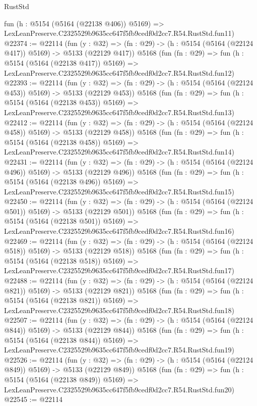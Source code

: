 \begin{lexlean}{RustStd}
\begin{coremodule}
    fun (h : @5154 (@5164 (@22138 @406)) @5169) =>
    LexLeanPreserve.C2325529b9635cc647f5fb9cedf0d2cc7.R54.RustStd.fun11)
@22374 := @22114
    (fun (y : @32) => (fn : @29) -> (h : @5154 (@5164 (@22124 @417)) @5169) -> @5133 (@22129 @417))
    @5168
    (fun (fn : @29) =>
    fun (h : @5154 (@5164 (@22138 @417)) @5169) =>
    LexLeanPreserve.C2325529b9635cc647f5fb9cedf0d2cc7.R54.RustStd.fun12)
@22393 := @22114
    (fun (y : @32) => (fn : @29) -> (h : @5154 (@5164 (@22124 @453)) @5169) -> @5133 (@22129 @453))
    @5168
    (fun (fn : @29) =>
    fun (h : @5154 (@5164 (@22138 @453)) @5169) =>
    LexLeanPreserve.C2325529b9635cc647f5fb9cedf0d2cc7.R54.RustStd.fun13)
@22412 := @22114
    (fun (y : @32) => (fn : @29) -> (h : @5154 (@5164 (@22124 @458)) @5169) -> @5133 (@22129 @458))
    @5168
    (fun (fn : @29) =>
    fun (h : @5154 (@5164 (@22138 @458)) @5169) =>
    LexLeanPreserve.C2325529b9635cc647f5fb9cedf0d2cc7.R54.RustStd.fun14)
@22431 := @22114
    (fun (y : @32) => (fn : @29) -> (h : @5154 (@5164 (@22124 @496)) @5169) -> @5133 (@22129 @496))
    @5168
    (fun (fn : @29) =>
    fun (h : @5154 (@5164 (@22138 @496)) @5169) =>
    LexLeanPreserve.C2325529b9635cc647f5fb9cedf0d2cc7.R54.RustStd.fun15)
@22450 := @22114
    (fun (y : @32) => (fn : @29) -> (h : @5154 (@5164 (@22124 @501)) @5169) -> @5133 (@22129 @501))
    @5168
    (fun (fn : @29) =>
    fun (h : @5154 (@5164 (@22138 @501)) @5169) =>
    LexLeanPreserve.C2325529b9635cc647f5fb9cedf0d2cc7.R54.RustStd.fun16)
@22469 := @22114
    (fun (y : @32) => (fn : @29) -> (h : @5154 (@5164 (@22124 @518)) @5169) -> @5133 (@22129 @518))
    @5168
    (fun (fn : @29) =>
    fun (h : @5154 (@5164 (@22138 @518)) @5169) =>
    LexLeanPreserve.C2325529b9635cc647f5fb9cedf0d2cc7.R54.RustStd.fun17)
@22488 := @22114
    (fun (y : @32) => (fn : @29) -> (h : @5154 (@5164 (@22124 @821)) @5169) -> @5133 (@22129 @821))
    @5168
    (fun (fn : @29) =>
    fun (h : @5154 (@5164 (@22138 @821)) @5169) =>
    LexLeanPreserve.C2325529b9635cc647f5fb9cedf0d2cc7.R54.RustStd.fun18)
@22507 := @22114
    (fun (y : @32) => (fn : @29) -> (h : @5154 (@5164 (@22124 @844)) @5169) -> @5133 (@22129 @844))
    @5168
    (fun (fn : @29) =>
    fun (h : @5154 (@5164 (@22138 @844)) @5169) =>
    LexLeanPreserve.C2325529b9635cc647f5fb9cedf0d2cc7.R54.RustStd.fun19)
@22526 := @22114
    (fun (y : @32) => (fn : @29) -> (h : @5154 (@5164 (@22124 @849)) @5169) -> @5133 (@22129 @849))
    @5168
    (fun (fn : @29) =>
    fun (h : @5154 (@5164 (@22138 @849)) @5169) =>
    LexLeanPreserve.C2325529b9635cc647f5fb9cedf0d2cc7.R54.RustStd.fun20)
@22545 := @22114

\end{coremodule}
\end{lexlean}
